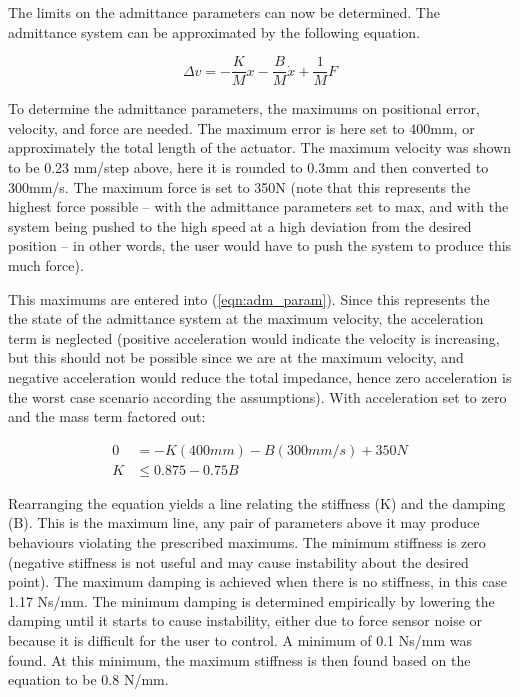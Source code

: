 \documentclass[12pt]{report}
\begin{document}
	The limits on the admittance parameters can now be determined. The admittance system can be approximated by the following equation. 
	
	\begin{equation} \label{eqn:adm_param}
		\Delta v = - \frac{K}{M}x - \frac{B}{M}\dot{x} + \frac{1}{M}F
	\end{equation}
	
	
	To determine the admittance parameters, the maximums on positional error, velocity, and force are needed. The maximum error is here set to 400mm, or approximately the total length of the actuator. The maximum velocity was shown to be 0.23 mm/step above, here it is rounded to 0.3mm and then converted to 300mm/s. The maximum force is set to 350N (note that this represents the highest force possible -- with the admittance parameters set to max, and with the system being pushed to the high speed at a high deviation from the desired position -- in other words, the user would have to push the system to produce this much force). 
	
	This maximums are entered into (\ref{eqn:adm_param}). Since this represents the the state of the admittance system at the maximum velocity, the acceleration term is neglected (positive acceleration would indicate the velocity is increasing, but this should not be possible since we are at the maximum velocity, and negative acceleration would reduce the total impedance, hence zero acceleration is the worst case scenario according the assumptions). With acceleration set to zero and the mass term factored out:
	
	\begin{align}
		0 &= -K(400mm) - B(300mm/s) + 350N \\
		K &\leq 0.875 - 0.75B  
	\end{align}
	
	Rearranging the equation yields a line relating the stiffness (K) and the damping (B). This is the maximum line, any pair of parameters above it may produce behaviours violating the prescribed maximums. The minimum stiffness is zero (negative stiffness is not useful and may cause instability about the desired point). The maximum damping is achieved when there is no stiffness, in this case 1.17 Ns/mm. The minimum damping is determined empirically by lowering the damping until it starts to cause instability, either due to force sensor noise or because it is difficult for the user to control. A minimum of 0.1 Ns/mm was found. At this minimum, the maximum stiffness is then found based on the equation to be 0.8 N/mm. 
	
\end{document}
